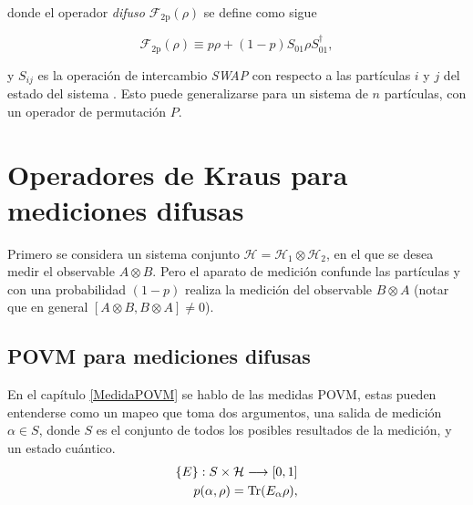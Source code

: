 donde el operador \textit{difuso } $\mathcal{F}_{\text{2p}}(\rho)$ se define como sigue 

\begin{equation}\label{operador_difuso}
    \mathcal{F}_{\text{2p}}(\rho)\equiv p\rho+(1-p)S_{01}\rho S_{01}^\dagger,
\end{equation}

 y  $S_{ij}$ es la operación de intercambio \textit{SWAP} con respecto a las partículas $i$ y $j$ del estado del sistema {\cite{Pineda_2021}}. Esto puede generalizarse para un sistema de $n$ partículas, con un operador de permutación $P$.%

 \section{Operadores de Kraus para mediciones difusas}

 Primero se considera un sistema conjunto $\mathcal{H}=\mathcal{H}_1\otimes \mathcal{H}_2$, en el que se desea medir el observable $A\otimes B$. Pero el aparato de medición confunde las partículas y con una probabilidad $(1-p) $ realiza la medición del observable $B\otimes A$ (notar que en general $[A\otimes B,B\otimes A]\ne 0$). 




    \subsection{POVM para mediciones difusas}

    En el capítulo {\ref{MedidaPOVM}} se hablo de las medidas POVM, estas pueden entenderse como un mapeo que toma dos argumentos, una salida de medición $\alpha \in S $, donde $S$ es el conjunto de todos los posibles resultados de la medición, y un estado cuántico.
    \begin{equation}\begin{split}
        \{E\}:S\times \mathcal{H}\longrightarrow [0,1]\\
        p(\alpha,\rho)={\rm Tr}(E_\alpha\rho),
    \end{split}\end{equation}
    
